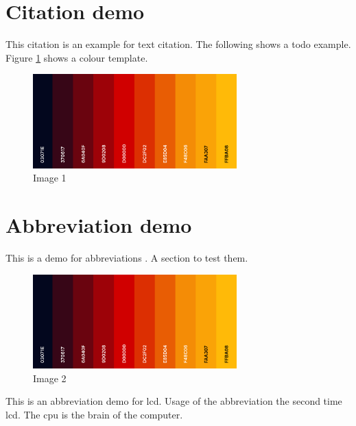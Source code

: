 \begin{spacing}{1.5}
\section{Citation demo}

This \textcite{dirac} citation is an example for text citation. The following shows a todo example.  Figure \ref{fig:colour_template_1} shows a colour template.

\begin{figure}[h]
	\centering
	\includegraphics[width=0.7\textwidth]{images/example.png}
	\caption{Image 1}
	\label{fig:colour_template_1}
\end{figure}

\section{Abbreviation demo}

This is a demo for abbreviations \cite{dirac}. A section to test \cite{einstein} them.

\begin{figure}[h]
	\centering
	\includegraphics[width=0.7\textwidth]{images/example.png}
	\caption{Image 2}
	\label{fig:colour_template_2}
\end{figure}

This is an abbreviation demo for \gls{lcd}. Usage of the abbreviation the second time \gls{lcd}. The \gls{cpu} is the brain of the computer.
\end{spacing}
